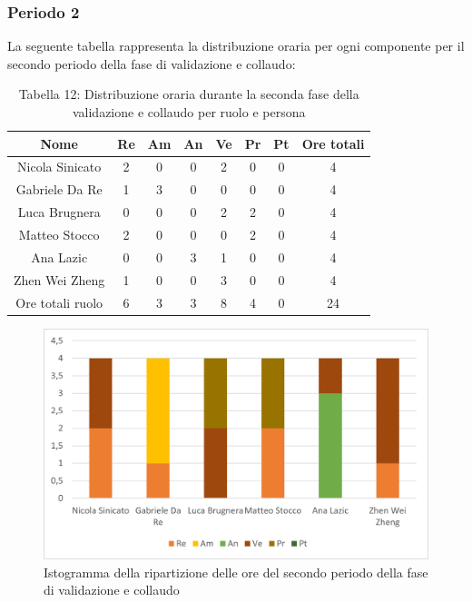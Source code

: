 \subsubsection{Periodo 2}
%
La seguente tabella rappresenta la distribuzione oraria per ogni componente per il secondo periodo della fase di validazione e collaudo:
\begin{table}[h]
	\setlength\extrarowheight{5pt}
	\centering
	\begin{tabularx}{\textwidth}{|ccccccc|c|}
		\hline
		\rowcolor{white}
		\textbf{Nome} & \textbf{Re} & \textbf{Am} & \textbf{An} & \textbf{Ve} & \textbf{Pr}& \textbf{Pt} & \textbf{Ore totali} \\
		\hline
		Nicola Sinicato &2&0&0&2&0&0&4 \\
		Gabriele Da Re &1&3&0&0&0&0&4 \\
		Luca Brugnera &0&0&0&2&2&0&4 \\
		Matteo Stocco &2&0&0&0&2&0&4 \\
		Ana Lazic &0&0&3&1&0&0&4 \\
		Zhen Wei Zheng &1&0&0&3&0&0&4 \\
		\hline
		Ore totali ruolo &6&3&3&8&4&0&24 \\
		\hline
	\end{tabularx}
	\vspace{10pt}
	\caption{Tabella 12: Distribuzione oraria durante la seconda fase della validazione e collaudo per ruolo e persona}
\end{table}
\begin{figure}[H]
    \centering
    \includegraphics[scale=0.6]{img/grafi preventivo/istogrammi/validazione/periodo2.png}
    \caption{Istogramma della ripartizione delle ore del secondo periodo della fase di validazione e collaudo}
\end{figure}
